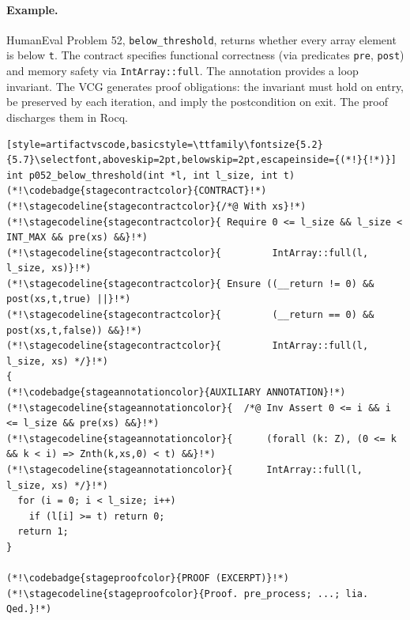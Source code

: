 \paragraph{Example.}
HumanEval Problem 52, \texttt{below\_threshold}, returns whether every array element is below \texttt{t}. 
The contract specifies functional correctness (via predicates \texttt{pre}, \texttt{post}) and memory safety via \texttt{IntArray::full}. The annotation provides a loop invariant. The VCG generates proof obligations: the invariant must hold on entry, be preserved by each iteration, and imply the postcondition on exit. The proof discharges them in Rocq.
\begin{lstlisting}[style=artifactvscode,basicstyle=\ttfamily\fontsize{5.2}{5.7}\selectfont,aboveskip=2pt,belowskip=2pt,escapeinside={(*!}{!*)}]
int p052_below_threshold(int *l, int l_size, int t)
(*!\codebadge{stagecontractcolor}{CONTRACT}!*)
(*!\stagecodeline{stagecontractcolor}{/*@ With xs}!*)
(*!\stagecodeline{stagecontractcolor}{ Require 0 <= l_size && l_size < INT_MAX && pre(xs) &&}!*)
(*!\stagecodeline{stagecontractcolor}{         IntArray::full(l, l_size, xs)}!*)
(*!\stagecodeline{stagecontractcolor}{ Ensure ((__return != 0) && post(xs,t,true) ||}!*)
(*!\stagecodeline{stagecontractcolor}{         (__return == 0) && post(xs,t,false)) &&}!*)
(*!\stagecodeline{stagecontractcolor}{         IntArray::full(l, l_size, xs) */}!*)
{
(*!\codebadge{stageannotationcolor}{AUXILIARY ANNOTATION}!*)
(*!\stagecodeline{stageannotationcolor}{  /*@ Inv Assert 0 <= i && i <= l_size && pre(xs) &&}!*)
(*!\stagecodeline{stageannotationcolor}{      (forall (k: Z), (0 <= k && k < i) => Znth(k,xs,0) < t) &&}!*)
(*!\stagecodeline{stageannotationcolor}{      IntArray::full(l, l_size, xs) */}!*)
  for (i = 0; i < l_size; i++)
    if (l[i] >= t) return 0;
  return 1;
}

(*!\codebadge{stageproofcolor}{PROOF (EXCERPT)}!*) (*!\stagecodeline{stageproofcolor}{Proof. pre_process; ...; lia. Qed.}!*)
\end{lstlisting}
